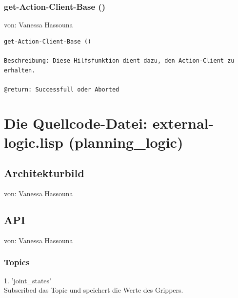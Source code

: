 \documentclass{suturo}
\makeatletter
\newcommand{\chapterauthor}[1]{%
  {\parindent0pt\vspace*{-27pt}%
  \linespread{0}\small\begin{flushright}von: #1\end{flushright}%
  \par\nobreak\vspace*{0pt}}
  \@afterheading%
}
\makeatother
\begin{document}
\subsubsection{get-Action-Client-Base ()}
\chapterauthor{Vanessa Hassouna}
\begin{verbatim}
get-Action-Client-Base ()

Beschreibung: Diese Hilfsfunktion dient dazu, den Action-Client zu erhalten.

@return: Successfull oder Aborted
\end{verbatim}





\section{Die Quellcode-Datei: external-logic.lisp (planning\_logic)}
\subsection{Architekturbild}
\chapterauthor{Vanessa Hassouna}


\begin{figure}[!htb]
\end{figure}


\subsection{API}
\chapterauthor{Vanessa Hassouna}
\subsubsection{Topics}
1. 'joint\_states' \\
Subscribed das Topic und speichert die Werte des Grippers.\\
 
\end{document}
